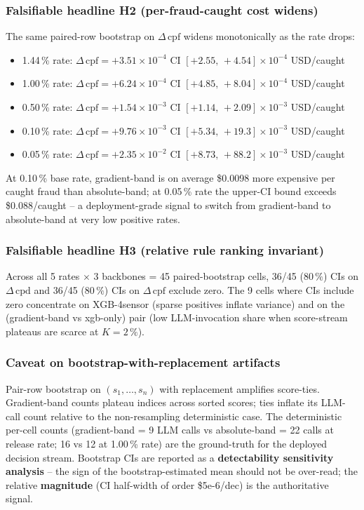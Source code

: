 \subsubsection{Falsifiable headline H2 (per-fraud-caught cost widens)}
The same paired-row bootstrap on $\Delta\,\mathrm{cpf}$ widens
monotonically as the rate drops:
\begin{itemize}
  \item 1.44\,\% rate: $\Delta\,\mathrm{cpf}=+3.51{\times}10^{-4}$
        CI $[+2.55,\,+4.54]{\times}10^{-4}$ USD/caught
  \item 1.00\,\% rate: $\Delta\,\mathrm{cpf}=+6.24{\times}10^{-4}$
        CI $[+4.85,\,+8.04]{\times}10^{-4}$ USD/caught
  \item 0.50\,\% rate: $\Delta\,\mathrm{cpf}=+1.54{\times}10^{-3}$
        CI $[+1.14,\,+2.09]{\times}10^{-3}$ USD/caught
  \item 0.10\,\% rate: $\Delta\,\mathrm{cpf}=+9.76{\times}10^{-3}$
        CI $[+5.34,\,+19.3]{\times}10^{-3}$ USD/caught
  \item 0.05\,\% rate: $\Delta\,\mathrm{cpf}=+2.35{\times}10^{-2}$
        CI $[+8.73,\,+88.2]{\times}10^{-3}$ USD/caught
\end{itemize}
At 0.10\,\% base rate, gradient-band is on average \$0.0098 more
expensive per caught fraud than absolute-band; at 0.05\,\% rate the
upper-CI bound exceeds \$0.088/caught -- a deployment-grade
signal to switch from gradient-band to absolute-band at very low
positive rates.

\subsubsection{Falsifiable headline H3 (relative rule ranking invariant)}
Across all 5 rates $\times$ 3 backbones = 45 paired-bootstrap
cells, 36/45 ($80\,\%$) CIs on $\Delta\,\mathrm{cpd}$ and 36/45
($80\,\%$) CIs on $\Delta\,\mathrm{cpf}$ exclude zero. The 9 cells
where CIs include zero concentrate on XGB-4sensor (sparse
positives inflate variance) and on the (gradient-band vs
xgb-only) pair (low LLM-invocation share when
score-stream plateaus are scarce at $K{=}2\,\%$).

\subsubsection{Caveat on bootstrap-with-replacement artifacts}
Pair-row bootstrap on $(s_1,\ldots,s_n)$ with replacement
amplifies score-ties. Gradient-band counts plateau indices across
sorted scores; ties inflate its LLM-call count relative to the
non-resampling deterministic case. The deterministic per-cell
counts (gradient-band = 9 LLM calls vs absolute-band = 22 calls at
release rate; 16 vs 12 at 1.00\,\% rate) are the ground-truth for
the deployed decision stream. Bootstrap CIs are reported as a
\textbf{detectability sensitivity analysis} -- the sign of the
bootstrap-estimated mean should not be over-read; the relative
\textbf{magnitude} (CI half-width of order \$5e-6/dec) is the
authoritative signal.

